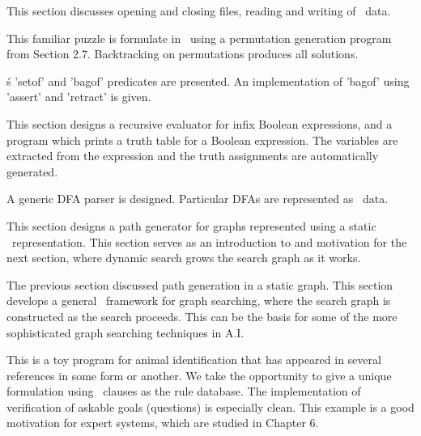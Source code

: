 
This section discusses opening and closing files, reading and writing of \prolog\
data.
 

This familiar puzzle is formulate in \prolog\ using a permutation generation
program from Section 2.7. Backtracking on permutations produces all solutions.
 

\prolog\'s 'setof' and 'bagof' predicates are presented. An implementation of
'bagof' using 'assert' and 'retract' is given.


This section designs a recursive evaluator for infix Boolean expressions, and a
program which prints a truth table for a Boolean expression. The variables are
extracted from the expression and the truth assignments are automatically
generated.


A generic DFA parser is designed. Particular DFAs are represented as \prolog\
data.
 

This section designs a path generator for graphs represented using a static
\prolog\ representation. This section serves as an introduction to and motivation
for the next section, where dynamic search grows the search graph as it works.
 
\secrel{2.16 Search} 

The previous section discussed path generation in a static graph. This section
develops a general \prolog\ framework for graph searching, where the search graph
is constructed as the search proceeds. This can be the basis for some of the
more sophisticated graph searching techniques in A.I.


This is a toy program for animal identification that has appeared in several
references in some form or another. We take the opportunity to give a unique
formulation using \prolog\ clauses as the rule database. The implementation of
verification of askable goals (questions) is especially clean. This example is a
good motivation for expert systems, which are studied in Chapter 6.

\secrel{2.18 Clauses as data} 

